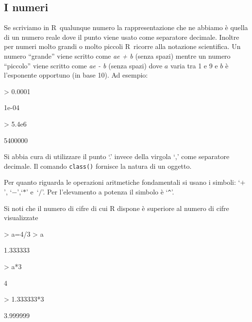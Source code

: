 \documentclass[onecolumn,11pt]{book}
\newcommand{\varia}[1]{\textsl{\textsf{#1}}}
\newcommand{\rpr}{\textsf{R}~}
\begin{document}
\subsection{I numeri}
Se scriviamo in \rpr qualunque numero la rappresentazione che ne abbiamo \`e quella di un numero reale dove  il punto viene usato come separatore decimale. Inoltre per numeri molto grandi o molto piccoli \rpr ricorre alla notazione scientifica. Un numero  ``grande''  viene scritto come
\varia{ae + b} (senza spazi) mentre un numero  ``piccolo'' viene scritto come
\varia{ae - b} (senza spazi) 
dove $a$ varia tra 1 e 9 e $b$  \`e l'esponente opportuno (in base 10). Ad esempio:
\begin{Schunk}
\begin{Sinput}
> 0.0001
\end{Sinput}
\begin{Soutput}
[1] 1e-04
\end{Soutput}
\begin{Sinput}
> 5.4e6
\end{Sinput}
\begin{Soutput}
[1] 5400000
\end{Soutput}
\end{Schunk}
Si abbia cura di utilizzare il punto `.' invece della virgola `,'  come separatore decimale.  Il comando \texttt{class()} fornisce la natura di un oggetto.

Per quanto riguarda le operazioni aritmetiche fondamentali si usano i simboli:
`$+$', `$-$',`$*$' e~`$/$'. Per l'elevamento a potenza il simbolo  \`e `\texttt{\^}'.

Si noti  che il numero di cifre di cui \textsf{R} dispone  \`e superiore al numero di cifre visualizzate
\begin{Schunk}
\begin{Sinput}
> a=4/3
> a
\end{Sinput}
\begin{Soutput}
[1] 1.333333
\end{Soutput}
\begin{Sinput}
> a*3
\end{Sinput}
\begin{Soutput}
[1] 4
\end{Soutput}
\begin{Sinput}
> 1.333333*3
\end{Sinput}
\begin{Soutput}
[1] 3.999999
\end{Soutput}
\end{Schunk}
\end{document}
